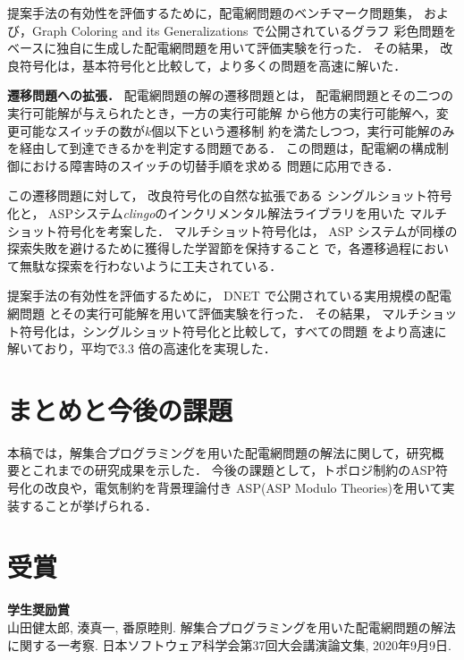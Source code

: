 \documentclass[a4j,10pt,dvipdfmx]{jarticle}
\begin{document}
\begin{multicols}{1}
提案手法の有効性を評価するために，配電網問題のベンチマーク問題集，
および，Graph Coloring and its Generalizations で公開されているグラフ
彩色問題をベースに独自に生成した配電網問題を用いて評価実験を行った．
その結果，
改良符号化は，基本符号化と比較して，より多くの問題を高速に解いた．

\textbf{遷移問題への拡張．}
配電網問題の解の遷移問題とは，
配電網問題とその二つの実行可能解が与えられたとき，一方の実行可能解
から他方の実行可能解へ，変更可能なスイッチの数が$k$個以下という遷移制
約を満たしつつ，実行可能解のみを経由して到達できるかを判定する問題である．
この問題は，配電網の構成制御における障害時のスイッチの切替手順を求める
問題に応用できる．

この遷移問題に対して，
改良符号化の自然な拡張である
シングルショット符号化と，
ASPシステム\textit{clingo}のインクリメンタル解法ライブラリを用いた
マルチショット符号化を考案した．
マルチショット符号化は，
ASP システムが同様の探索失敗を避けるために獲得した学習節を保持すること
で，各遷移過程において無駄な探索を行わないように工夫されている．

提案手法の有効性を評価するために，
DNET で公開されている実用規模の配電網問題
とその実行可能解を用いて評価実験を行った．
その結果，
マルチショット符号化は，シングルショット符号化と比較して，すべての問題
をより高速に解いており，平均で3.3 倍の高速化を実現した．

\section{まとめと今後の課題}
本稿では，解集合プログラミングを用いた配電網問題の解法に関して，研究概
要とこれまでの研究成果を示した．
%
今後の課題として，トポロジ制約のASP符号化の改良や，電気制約を背景理論付き
ASP(ASP Modulo Theories)を用いて実装することが挙げられる．

\section{受賞}
\noindent\textbf{学生奨励賞}\\
山田健太郎, 湊真一, 番原睦則.
解集合プログラミングを用いた配電網問題の解法に関する一考察. 
日本ソフトウェア科学会第37回大会講演論文集,
2020年9月9日. 


\end{multicols}
\end{document}
